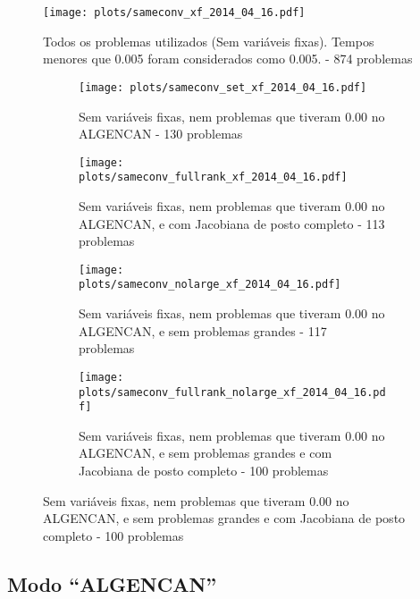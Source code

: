 \documentclass{article}
\begin{document}
\begin{figure}[H]
  \centering
  \texttt{[image: plots/sameconv\_xf\_2014\_04\_16.pdf]}
  \caption{Todos os problemas utilizados (Sem variáveis fixas). Tempos menores
    que 0.005 foram considerados como 0.005. - 874 problemas}
\end{figure}
\begin{figure}[H]
  \centering
  \begin{subfigure}{0.48\textwidth}
    \texttt{[image: plots/sameconv\_set\_xf\_2014\_04\_16.pdf]}
    \caption{Sem variáveis fixas, nem problemas
      que tiveram 0.00 no ALGENCAN - 130 problemas}
  \end{subfigure}
  \begin{subfigure}{0.48\textwidth}
    \texttt{[image: plots/sameconv\_fullrank\_xf\_2014\_04\_16.pdf]}
    \caption{Sem variáveis fixas, nem problemas
      que tiveram 0.00 no ALGENCAN, e com Jacobiana de posto completo - 113
      problemas}
  \end{subfigure}
  \begin{subfigure}{0.48\textwidth}
    \texttt{[image: plots/sameconv\_nolarge\_xf\_2014\_04\_16.pdf]}
    \caption{Sem variáveis fixas, nem problemas
      que tiveram 0.00 no ALGENCAN, e sem problemas grandes - 117 problemas}
  \end{subfigure}
  \begin{subfigure}{0.48\textwidth}
    \texttt{[image: plots/sameconv\_fullrank\_nolarge\_xf\_2014\_04\_16.pdf]}
    \caption{Sem variáveis fixas, nem problemas
      que tiveram 0.00 no ALGENCAN, e sem problemas grandes e com Jacobiana de
      posto completo - 100 problemas}
  \end{subfigure}
\end{figure}

\subsection{Modo ``ALGENCAN''}
\end{document}
